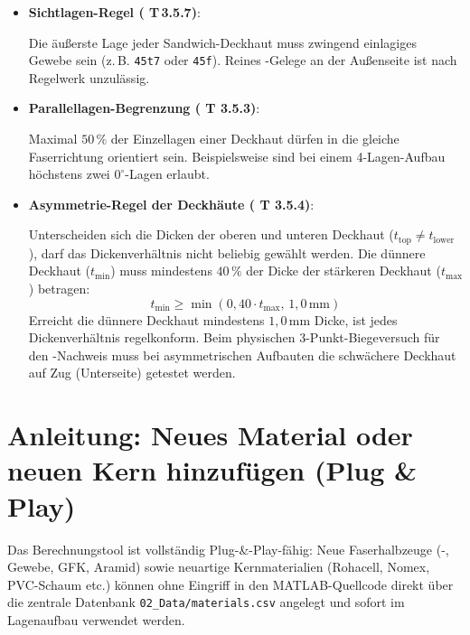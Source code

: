 \begin{itemize}
    \item \textbf{Sichtlagen-Regel ( T\,3.5.7)}: \par
    Die äußerste Lage jeder Sandwich-Deckhaut muss zwingend einlagiges Gewebe sein (z.\,B. \texttt{45t7} oder \texttt{45f}). Reines -Gelege an der Außenseite ist nach Regelwerk unzulässig.

    \item \textbf{Parallellagen-Begrenzung ( T 3.5.3)}: \par
    Maximal $50\,\%$ der Einzellagen einer Deckhaut dürfen in die gleiche Faserrichtung orientiert sein. Beispielsweise sind bei einem 4-Lagen-Aufbau höchstens zwei $0^\circ$-Lagen erlaubt.

    \item \textbf{Asymmetrie-Regel der Deckhäute ( T 3.5.4)}: \par
    Unterscheiden sich die Dicken der oberen und unteren Deckhaut ($t_{\text{top}} \ne t_{\text{lower}}$), darf das Dickenverhältnis nicht beliebig gewählt werden. Die dünnere Deckhaut ($t_{\text{min}}$) muss mindestens $40\,\%$ der Dicke der stärkeren Deckhaut ($t_{\text{max}}$) betragen:
    \begin{equation}
        t_{\text{min}} \ge \min(0{,}40 \cdot t_{\text{max}}, \, 1{,}0\,\text{mm})
    \end{equation}
    Erreicht die dünnere Deckhaut mindestens $1{,}0\,\text{mm}$ Dicke, ist jedes Dickenverhältnis regelkonform. Beim physischen 3-Punkt-Biegeversuch für den -Nachweis muss bei asymmetrischen Aufbauten die schwächere Deckhaut auf Zug (Unterseite) getestet werden.

\end{itemize}
\clearpage





\section{Anleitung: Neues Material oder neuen Kern hinzufügen (Plug \& Play)} \label{sec:add_materials}

Das Berechnungstool ist vollständig Plug-\&-Play-fähig: Neue Faserhalbzeuge (-, Gewebe, GFK, Aramid) sowie neuartige Kernmaterialien (Rohacell, Nomex, PVC-Schaum etc.) können ohne Eingriff in den MATLAB-Quellcode direkt über die zentrale Datenbank \texttt{02\_Data/materials.csv} angelegt und sofort im Lagenaufbau verwendet werden.

